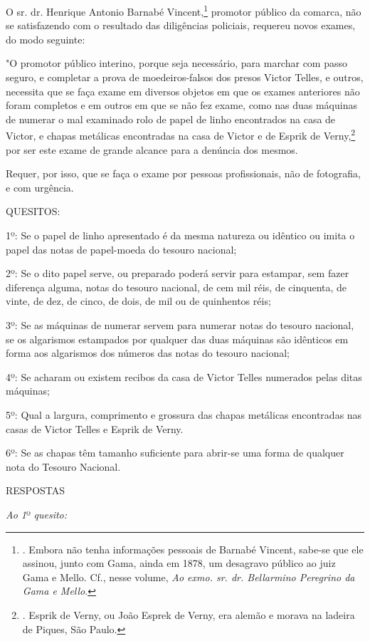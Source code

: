 O sr. dr. Henrique Antonio Barnabé Vincent,\footnote{. Embora não tenha
  informações pessoais de Barnabé Vincent, sabe-se que ele assinou,
  junto com Gama, ainda em 1878, um desagravo público ao juiz Gama e
  Mello. Cf., nesse volume, \emph{Ao exmo. sr. dr. Bellarmino Peregrino
  da Gama e Mello}.} promotor público da comarca, não se satisfazendo
com o resultado das diligências policiais, requereu novos exames, do
modo seguinte:

"O promotor público interino, porque seja necessário, para marchar com
passo seguro, e completar a prova de moedeiros-falsos dos presos Victor
Telles, e outros, necessita que se faça exame em diversos objetos em que
os exames anteriores não foram completos e em outros em que se não fez
exame, como nas duas máquinas de numerar o mal examinado rolo de papel
de linho encontrados na casa de Victor, e chapas metálicas encontradas
na casa de Victor e de Esprik de Verny,\footnote{. Esprik de Verny, ou
  João Esprek de Verny, era alemão e morava na ladeira de Piques, São
  Paulo.} por ser este exame de grande alcance para a denúncia dos
mesmos.

Requer, por isso, que se faça o exame por pessoas profissionais, não de
fotografia, e com urgência.

QUESITOS:

1º: Se o papel de linho apresentado é da mesma natureza ou idêntico ou
imita o papel das notas de papel-moeda do tesouro nacional;

2º: Se o dito papel serve, ou preparado poderá servir para estampar, sem
fazer diferença alguma, notas do tesouro nacional, de cem mil réis, de
cinquenta, de vinte, de dez, de cinco, de dois, de mil ou de quinhentos
réis;

3º: Se as máquinas de numerar servem para numerar notas do tesouro
nacional, se os algarismos estampados por qualquer das duas máquinas são
idênticos em forma aos algarismos dos números das notas do tesouro
nacional;

4º: Se acharam ou existem recibos da casa de Victor Telles numerados
pelas ditas máquinas;

5º: Qual a largura, comprimento e grossura das chapas metálicas
encontradas nas casas de Victor Telles e Esprik de Verny.

6º: Se as chapas têm tamanho suficiente para abrir-se uma forma de
qualquer nota do Tesouro Nacional.

RESPOSTAS

\emph{Ao 1}º \emph{quesito:}

